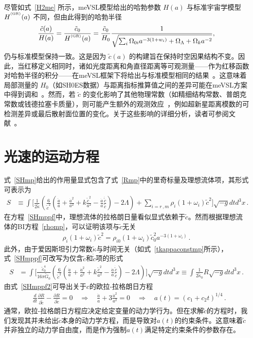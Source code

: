 \documentclass[jkps,preprint,fleqn]{revtex4}
\newcommand{\tc}{\tilde{c}}
\newcommand{\tG}{\tilde{G}}
\newcommand{\GR}{\text{GR}}
\newcommand{\tkapp}{\tilde{\kappa}}
\begin{document}
\begin{CJK*}{UTF8}{gbsn}
尽管如式~\eqref{H2me} 所示，meVSL模型给出的哈勃参数 $H(a)$ 与标准宇宙学模型 $H^{\textsuperscript{\tiny (\GR)}}(a)$ 不同，但由此得到的哈勃半径
\begin{equation}
    \frac{\tilde{c}(a)}{H(a)}  = \frac{\tc_0}{H^{\textsuperscript{\tiny (\GR)}}(a)} = \frac{\tilde{c}_0}{H_0} \frac{1}{\sqrt{\sum_i \Omega_{0i} a^{-3(1+w_i)} + \Omega_\Lambda + \Omega_k a^{-2}}},
\end{equation}
仍与标准模型保持一致。这是因为 $\tilde{c}(a)$ 的构建旨在保持时空因果结构不变。因此，当红移定义相同时，诸如光度距离和角直径距离等可观测量——作为红移函数对哈勃半径的积分——在meVSL框架下将给出与标准模型相同的结果~\cite{Lee:2020zts}。这意味着局部测量的 $H_0$（如SH0ES数据）与距离指标推算值之间的差异可能在meVSL方案中得到调和~\cite{Lee:2024nya}。然而，若 $\tilde{c}$ 的变化影响了其他物理常数（如精细结构常数、普朗克常数或钱德拉塞卡质量），则可能产生额外的观测效应~\cite{Lee:2020zts,Lee:2021xwh}，例如超新星距离模数的可检测差异或最后散射面位置的变化。关于这些影响的详细分析，读者可参阅文献~\cite{Lee:2020zts}。
\section{光速的运动方程}
\label{sec:sol}

式~\eqref{SHmp}给出的作用量显式包含了式~\eqref{Rmp}中的里奇标量及理想流体项，其形式可表示为
\begin{align}
S &\equiv \int \Biggl[ \frac{1}{2 \tkapp} \left( \frac{6}{\tc^2} \left( \frac{\ddot{a}}{a} + \frac{\dot{a}^2}{a^2} + k \frac{\tc^2}{a^2} - \frac{\dot{a}}{a} \frac{\dot{\tc}}{ \tc} \right)  - 2 \Lambda \right) + \sum_{i=r\,,m} \rho_i (1 + \omega_i ) \tc^2 \Biggr] \sqrt{-g} dt d^3x \label{SHmppf} \,.
\end{align}
在方程~\eqref{SHmppf}中，理想流体的拉格朗日量看似显式依赖于$\tc$。然而根据理想流体的BI方程~\eqref{rhomp}，可以证明该项与$\tc$无关
\begin{align}
 \rho_i (1 + \omega_i ) \tc^2 =  \rho_{i0} (1 + \omega_i ) \tc_{0}^2 a^{-3(1 + \omega_i )}  \label{rhoi} \,.
\end{align}
此外，由于爱因斯坦引力常数$\tkapp$与时间无关（如式~\eqref{tkappaconstmp}所示），式~\eqref{SHmppf}可改写为仅含$\tc$和$\dot{\tc}$项的形式
\begin{align}
S &= \int \Biggl[ \frac{\tc_0^4}{16 \pi \tG_0} \left( \frac{6}{\tc^2} \left( \frac{\ddot{a}}{a} + \frac{\dot{a}^2}{a^2} + k \frac{\tc^2}{a^2} - \frac{\dot{a}}{a} \frac{\dot{\tc}}{ \tc} \right)  - 2 \Lambda \right)  \Biggr] \sqrt{-g} dt d^3x \equiv \int \frac{1}{2 \tkapp_0} R \sqrt{-g} dt d^3x \label{SHmppf2} \,.
\end{align}
由式~\eqref{SHmppf2}可导出关于\( c \)的欧拉-拉格朗日方程
\begin{align}
& \frac{d}{dt} \frac{\partial R}{\partial \dot{\tc}} - \frac{\partial R}{\partial \tc} = 0 \quad \Rightarrow \quad \frac{\ddot{a}}{a} + 3 \frac{\dot{a}^2}{a^2} = 0 \quad \Rightarrow \quad a(t) = (c_1 + c_2 t)^{1/4} \label{eomtc} \,.
\end{align}
通常，欧拉-拉格朗日方程应决定给定变量的动力学行为。但在求解$\tc$的方程时，我们发现其并未给出$\tc$本身的动力学方程，而是导致对$a(t)$的约束条件。这意味着$\tc$并非独立的动力学自由度，而是作为强制$a(t)$满足特定约束条件的参数存在。


\end{CJK*}
\end{document}
